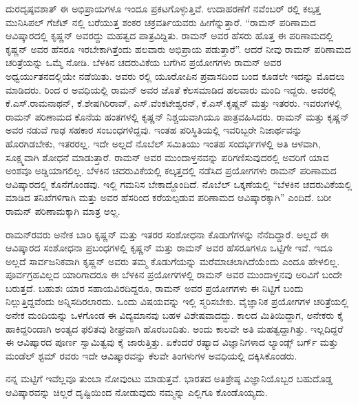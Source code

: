 ದುರದೃಷ್ಠವಶಾತ್ ಈ ಅಭಿಪ್ರಾಯಗಳೂ ಇಂದೂ ಪ್ರಕಟಗೊಳ್ಳುತ್ತಿವೆ. ಉದಾಹರಣೆಗೆ ನವೆಂಬರ್ ರಲ್ಲಿ ಕಲ್ಕತ್ತ ಮುನಿಸಿಪಲ್ ಗೆಜೆಟ್ ನಲ್ಲಿ ಬರೆಯುತ್ತ ಶಂಕರ ಚಕ್ರವರ್ತಿಯವರು ಹೀಗೆನ್ನುತ್ತಾರೆ. \enginline{-} “ರಾಮನ್ ಪರಿಣಾಮದ ಆವಿಷ್ಕಾರದಲ್ಲಿ ಕೃಷ್ಣನ್ ಅವರದ್ದು ಮಹತ್ವದ ಪಾತ್ರವಿದ್ದಿತು. ರಾಮನ್ ಅವರ ಹೆಸರು ಹೊತ್ತ ಈ ಪರಿಣಾಮದಲ್ಲಿ ಕೃಷ್ಣನ್ ಅವರ ಹೆಸರೂ ಇರಬೇಕಾಗಿತ್ತೆಂದು ಹಲವಾರು ಅಭಿಪ್ರಾಯ ಪಡುತ್ತಾರೆ”. ಆದರೆ ನೀವು ರಾಮನ್ ಪರಿಣಾಮದ ಚರಿತ್ರೆಯನ್ನು ಒಮ್ಮೆ ನೋಡಿ. ಬೆಳಕಿನ ಚದರುವಿಕೆಯ ಬಗೆಗಿನ ಪ್ರಯೋಗಗಳು ರಾಮನ್ ಅವರ ಅಧ್ವರ್ಯುತನದಲ್ಲಿಯೇ ನಡೆಯಿತು. ಅವರು ರಲ್ಲಿ ಯೂರೋಪಿನ ಪ್ರವಾಸದಿಂದ ಬಂದ ಕೂಡಲೇ ಇದನ್ನು ಮೊದಲು ಮಾಡಿದರು.  ರಿಂದ  ರ ಅವಧಿಯಲ್ಲಿ ರಾಮನ್ ಅವರ ಜೊತೆ ಕೆಲಸಮಾಡಿದ ಹಲವಾರು ಮಂದಿ ಇದ್ದರು. ಅವರಲ್ಲಿ ಕೆ.ಎಸ್.ರಾಮನಾಥನ್, ಕೆ.ಶೇಷಗಿರಿರಾವ್, ಎಸ್.ವೆಂಕಟೇಶ್ವರನ್, ಕೆ.ಎಸ್.ಕೃಷ್ಣನ್ ಮತ್ತು ಇತರರು. ಇವರುಗಳಲ್ಲಿ ರಾಮನ್ ಪರಿಣಾಮದ ಕೊನೆಯ ಹಂತಗಳಲ್ಲಿ ಕೃಷ್ಣನ್ ನಿಶ್ಚಯವಾಗಿಯೂ ಪಾತ್ರವಹಿಸಿದರು. ರಾಮನ್ ಮತ್ತು ಕೃಷ್ಣನ್ ಅವರ ನಡುವೆ ಗಾಢ ಸಹಕಾರ ಸಂಬಂಧಗಳಿದ್ದವು. ಇಂತಹ ಪರಿಸ್ಥಿತಿಯಲ್ಲಿ ಇವರಿಬ್ಬರೇ ನಿಜಾರ್ಥವನ್ನು ಹೊರಗಿಡಬೇಕು, ಇತರರಲ್ಲ. ಇದೇ ಅಲ್ಲದೆ ನೊಬೆಲ್ ಸಮಿತಿಯು ಇಂತಹ ಸಂದರ್ಭಗಳಲ್ಲಿ ಅತಿ ಆಳವಾಗಿ, ಸೂಕ್ಷ್ಮವಾಗಿ ಶೋಧನೆ ಮಾಡುತ್ತಾರೆ. ರಾಮನ್ ಅವರ ಮುಂದಾಳ್ತನವನ್ನು ಪರಿಗಣಿಸುವುದರಲ್ಲಿ ಅವರಿಗೆ ಯಾವ ಅಂಶವೂ ಅಡ್ಡಿಯಾಗಲಿಲ್ಲ. ಬೆಳಕಿನ ಚದರುವಿಕೆಯಲ್ಲಿ ಕಲ್ಕತ್ತದಲ್ಲಿ ನಡೆಸಿದ ಪ್ರಯೋಗಗಳು ರಾಮನ್ ಪರಿಣಾಮದ ಆವಿಷ್ಕಾರದಲ್ಲಿ ಕೊನೆಗೊಂಡವು. ಇಲ್ಲಿ ಗಮನಿಸ ಬೇಕಾದ್ದೊಂದಿದೆ. ನೊಬೆಲ್ ಒಕ್ಕಣೆಯಲ್ಲಿ \enginline{-} “ಬೆಳಕಿನ ಚದರುವಿಕೆಯಲ್ಲಿ ಮಾಡಿದ ತನಿಖೆಗಳಿಗಾಗಿ ಮತ್ತು ಅವರ ಹೆಸರಿಂದ ಕರೆಯಲ್ಪಡುವ ಪರಿಣಾಮದ ಆವಿಷ್ಕಾರಕ್ಕಾಗಿ”\enginline{-} ಎಂದಿದೆ. ಬರೀ ರಾಮನ್ ಪರಿಣಾಮಕ್ಕಾಗಿ ಮಾತ್ರ ಅಲ್ಲ.

ರಾಮನ್‍ರವರು ಅನೇಕ ಬಾರಿ ಕೃಷ್ಣನ್ ಮತ್ತು ಇತರರ ಸಂಶೋಧನಾ ಕೊಡುಗೆಗಳನ್ನು ನೆನೆದಿದ್ದಾರೆ. ಅಲ್ಲದೆ ಈ ಆವಿಷ್ಕಾರದ ಸಂಶೋಧನಾ ಪ್ರಬಂಧಗಳಲ್ಲಿ ಕೃಷ್ಣನ್ ಮತ್ತು ರಾಮನ್ ಅವರ ಹೆಸರೂಗಳೂ ಒಟ್ಟಿಗೇ ಇವೆ. ಇದೂ ಅಲ್ಲದೆ ಸಾರ್ವಜನಿಕವಾಗಿ ಕೃಷ್ಣನ್ ಅವರು ತಮ್ಮ ಕೊಡುಗೆಯನ್ನು ಮರೆಮಾಚಲಾಗಿದೆಯೆಂದು ಎಂದೂ ಹೇಳಲಿಲ್ಲ. ಪೂರ್ವಗ್ರಹವಿಲ್ಲದ ಯಾರಿಗಾದರೂ ಈ ಬೆಳಕಿನ ಪ್ರಯೋಗಗಳಲ್ಲಿ ರಾಮನ್ ಅವರ ಮುಂದಾಳ್ತನವು ಅರಿವಿಗೆ ಬಂದೇ ಬರುತ್ತದೆ. ಬಹುಶಃ ಯಾರ ಸಹಾಯವಿರದಿದ್ದರೂ, ರಾಮನ್ ಅವರ ಪ್ರಯೋಗಗಳು ಈ ನಿಟ್ಟಿಗೆ ಬಂದು ನಿಲ್ಲುತ್ತಿದ್ದವೆಂದು ಅನ್ನಿಸದಿರಲಾರದು. ಒಂದು ವಿಷಯವನ್ನು ಇಲ್ಲಿ ಸ್ಮರಿಸಬೇಕು. ವೈಜ್ಞಾನಿಕ ಪ್ರಯೋಗಗಳ ಚರಿತ್ರೆಯಲ್ಲಿ ಅನೇಕ ಮಂದಿಯನ್ನು ಒಳಗೊಂಡ ಈ ವಿದ್ಯಮಾನವು ಬಹಳ ವಿಶೇಷವಾದದ್ದು. ಕಾಲದ ಮಿತಿಯಿದ್ದಾಗ, ಅನೇಕರು ಕೈ ಹಾಕಿದ್ದರಿಂದಾಗಿ ಅಂತ್ಯದ ಫಲಿತವು ಶೀಘ್ರವಾಗಿ ಹೊರಬಂದಿತು. ಅಂದು ಕಾಲವೇ ಅತಿ ಮಹತ್ವದ್ದಾಗಿತ್ತು. ಇಲ್ಲದಿದ್ದರೆ ಈ ಆವಿಷ್ಕಾರದ ಪೂರ್ಣ ಸ್ವಾಮಿತ್ವವು ಕೈ ಜಾರುತ್ತಿತ್ತು. ಏಕೆಂದರೆ ರಷ್ಯಾದ ವಿಜ್ಞಾನಿಗಳಾದ ಲ್ಯಾಂಡ್ಸ್ ಬರ್ಗ್ ಮತ್ತು ಮಂಡೆಲ್ ಶ್ಟಮ್ ರವರು ಇದೇ ಆವಿಷ್ಕಾರವನ್ನು ಕೆಲವೇ ತಿಂಗಳುಗಳ ಅವಧಿಯಲ್ಲಿ ದಕ್ಕಿಸಿಕೊಂಡರು.

ನನ್ನ ಮಟ್ಟಿಗೆ ಇವೆಲ್ಲವೂ ತುಂಬಾ ನೋವುಂಟು ಮಾಡುತ್ತವೆ. ಭಾರತದ ಅತಿಶ್ರೇಷ್ಠ ವಿಜ್ಞಾನಿಯೊಬ್ಬರ ಬಹುದೊಡ್ಡ ಆವಿಷ್ಕಾರವನ್ನು ಚಿಲ್ಲರೆ ದೃಷ್ಟಿಯಿಂದ ನೋಡುವುದು ನಮ್ಮನ್ನು ಎಲ್ಲಿಗೂ ಕೊಂಡೊಯ್ಯದು.



